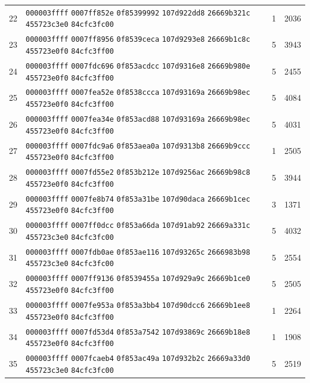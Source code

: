 \begin{longtable}{@{}r p{12cm} r r@{}}
22 & \texttt{000003ffff} \texttt{0007ff852e} \texttt{0f85399992} \texttt{107d922dd8} \texttt{26669b321c} \texttt{455723c3e0} \texttt{84cfc3fc00} & 1 & 2036 \\
23 & \texttt{000003ffff} \texttt{0007ff8956} \texttt{0f8539ceca} \texttt{107d9293e8} \texttt{26669b1c8c} \texttt{455723e0f0} \texttt{84cfc3ff00} & 5 & 3943 \\
24 & \texttt{000003ffff} \texttt{0007fdc696} \texttt{0f853acdcc} \texttt{107d9316e8} \texttt{26669b980e} \texttt{455723e0f0} \texttt{84cfc3ff00} & 5 & 2455 \\
25 & \texttt{000003ffff} \texttt{0007fea52e} \texttt{0f8538ccca} \texttt{107d93169a} \texttt{26669b98ec} \texttt{455723e0f0} \texttt{84cfc3ff00} & 5 & 4084 \\
26 & \texttt{000003ffff} \texttt{0007fea34e} \texttt{0f853acd88} \texttt{107d93169a} \texttt{26669b98ec} \texttt{455723e0f0} \texttt{84cfc3ff00} & 5 & 4031 \\
27 & \texttt{000003ffff} \texttt{0007fdc9a6} \texttt{0f853aea0a} \texttt{107d9313b8} \texttt{26669b9ccc} \texttt{455723e0f0} \texttt{84cfc3ff00} & 1 & 2505 \\
28 & \texttt{000003ffff} \texttt{0007fd55e2} \texttt{0f853b212e} \texttt{107d9256ac} \texttt{26669b98c8} \texttt{455723e0f0} \texttt{84cfc3ff00} & 5 & 3944 \\
29 & \texttt{000003ffff} \texttt{0007fe8b74} \texttt{0f853a31be} \texttt{107d90daca} \texttt{26669b1cec} \texttt{455723e0f0} \texttt{84cfc3ff00} & 3 & 1371 \\
30 & \texttt{000003ffff} \texttt{0007ff0dcc} \texttt{0f853a66da} \texttt{107d91ab92} \texttt{26669a331c} \texttt{455723c3e0} \texttt{84cfc3fc00} & 5 & 4032 \\
31 & \texttt{000003ffff} \texttt{0007fdb0ae} \texttt{0f853ae116} \texttt{107d93265c} \texttt{2666983b98} \texttt{455723c3e0} \texttt{84cfc3fc00} & 5 & 2554 \\
32 & \texttt{000003ffff} \texttt{0007ff9136} \texttt{0f8539455a} \texttt{107d929a9c} \texttt{26669b1ce0} \texttt{455723e0f0} \texttt{84cfc3ff00} & 5 & 2505 \\
33 & \texttt{000003ffff} \texttt{0007fe953a} \texttt{0f853a3bb4} \texttt{107d90dcc6} \texttt{26669b1ee8} \texttt{455723e0f0} \texttt{84cfc3ff00} & 1 & 2264 \\
34 & \texttt{000003ffff} \texttt{0007fd53d4} \texttt{0f853a7542} \texttt{107d93869c} \texttt{26669b18e8} \texttt{455723e0f0} \texttt{84cfc3ff00} & 1 & 1908 \\
35 & \texttt{000003ffff} \texttt{0007fcaeb4} \texttt{0f853ac49a} \texttt{107d932b2c} \texttt{26669a33d0} \texttt{455723c3e0} \texttt{84cfc3fc00} & 5 & 2519 \\

\end{longtable}
